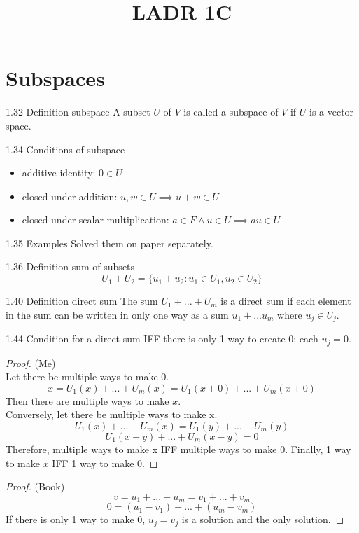 \documentclass[12pt, letterpaper]{article}
\title{LADR 1C}
\begin{document}
\maketitle

\section*{Subspaces}

\begin{imp}{1.32 Definition subspace}
A subset $U$ of $V$ is called a subspace of $V$ if $U$ is a vector space.
\end{imp}

\begin{imp}{1.34 Conditions of subspace}
\begin{itemize}
    \item additive identity: 
    $0\in U$
    \item closed under addition: 
    $u,w\in U \implies u+w\in U$
    \item closed under scalar multiplication:
    $a\in F\land u\in U \implies au\in U$
\end{itemize}
\end{imp}

\begin{imp}{1.35 Examples}
Solved them on paper separately.
\end{imp}

\begin{imp}{1.36 Definition sum of subsets}
$$U_1+U_2=\{u_1+u_2:u_1\in U_1,u_2\in U_2\}$$
\end{imp}

\begin{imp}{1.40 Definition direct sum}
The sum $U_1 + ... + U_m$ is a direct sum if each element in 
the sum can be written in only one way as a sum 
$u_1 + ... u_m$ where $u_j \in U_j$.
\end{imp}

\begin{imp}{1.44 Condition for a direct sum}
IFF there is only 1 way to create 0: each $u_j = 0$.
\begin{proof} (Me)
\\Let there be multiple ways to make 0.
$$x=U_1(x) + ... + U_m(x)=U_1(x+0) + ... + U_m(x+0)$$
Then there are multiple ways to make $x$.
\\Conversely, let there be multiple ways to make x.
$$U_1(x)+...+U_m(x)=U_1(y)+...+U_m(y)$$
$$U_1(x-y)+...+U_m(x-y)=0$$
Therefore, multiple ways to make x IFF multiple ways to make 0.
Finally, 1 way to make $x$ IFF 1 way to make 0.
\end{proof}
\begin{proof} (Book)
$$v = u_1 + ... + u_m = v_1 + ... + v_m$$
$$0 = (u_1 - v_1) + ... + (u_m - v_m)$$
If there is only 1 way to make 0, $u_j = v_j$ is a solution and the only solution.
\end{proof}
\end{imp}
\end{document}
